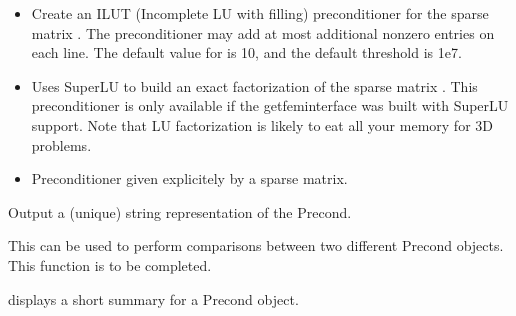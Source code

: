 \documentclass[a4paper,11pt,english]{sphinxmanual}
\begin{document}
\begin{fulllineitems}
\begin{itemize}
\item {} 
Create an ILUT (Incomplete LU with filling) preconditioner for the
sparse matrix . The preconditioner may add at most 
additional non\sphinxhyphen{}zero entries on each line. The default value for
 is 10, and the default threshold is 1e\sphinxhyphen{}7.

\item {} 
Uses SuperLU to build an exact factorization of the sparse matrix .
This preconditioner is only available if the getfem\sphinxhyphen{}interface was
built with SuperLU support. Note that LU factorization is likely to
eat all your memory for 3D problems.

\item {} 
Preconditioner given explicitely by a sparse matrix.

\end{itemize}

\begin{fulllineitems}
\label{\detokenize{python/cmdref_Precond:getfem.Precond.char}}
Output a (unique) string representation of the Precond.

This can be used to perform comparisons between two
different Precond objects.
This function is to be completed.

\end{fulllineitems}


\begin{fulllineitems}
\label{\detokenize{python/cmdref_Precond:getfem.Precond.display}}
displays a short summary for a Precond object.

\end{fulllineitems}



\end{fulllineitems}
\end{document}
